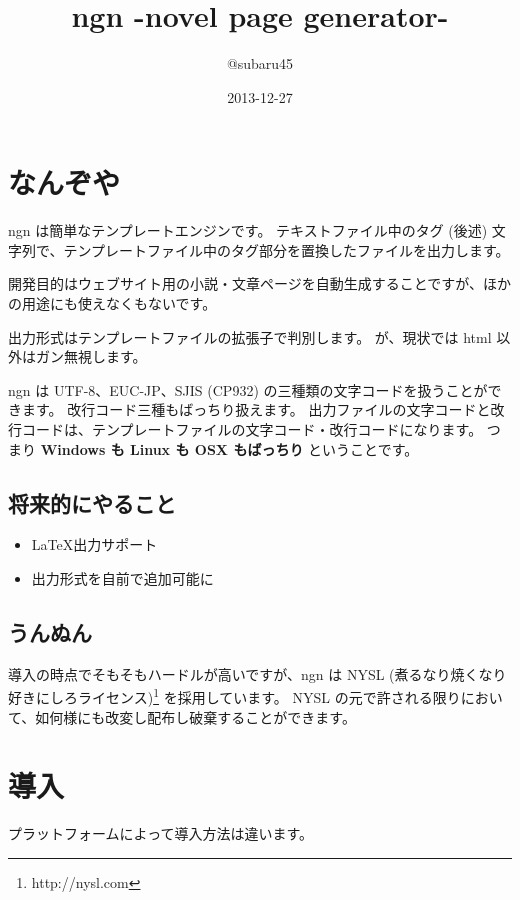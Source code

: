 \documentclass[a4j]{jsarticle}
\begin{document}
\title{ngn -novel page generator-}
\author{@subaru45}
\date{2013-12-27}
\maketitle


\section{なんぞや}
ngn は簡単なテンプレートエンジンです。
テキストファイル中のタグ (後述) 文字列で、テンプレートファイル中のタグ部分を置換したファイルを出力します。

開発目的はウェブサイト用の小説・文章ページを自動生成することですが、ほかの用途にも使えなくもないです。

出力形式はテンプレートファイルの拡張子で判別します。
が、現状では html 以外はガン無視します。

ngn は UTF-8、EUC-JP、SJIS (CP932) の三種類の文字コードを扱うことができます。
改行コード三種もばっちり扱えます。
出力ファイルの文字コードと改行コードは、テンプレートファイルの文字コード・改行コードになります。
つまり \textbf{Windows も Linux も OSX もばっちり} ということです。


\subsection{将来的にやること}

\begin{itemize}
  \item \LaTeX 出力サポート
  \item 出力形式を自前で追加可能に
\end{itemize}

\subsection{うんぬん}
導入の時点でそもそもハードルが高いですが、ngn は NYSL (煮るなり焼くなり好きにしろライセンス)\footnote{http://nysl.com} を採用しています。
NYSL の元で許される限りにおいて、如何様にも改変し配布し破棄することができます。


\section{導入}

プラットフォームによって導入方法は違います。
\end{document}
